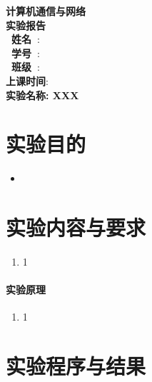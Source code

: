 \documentclass[a4paper]{ctexart}
\begin{document}
  \begin{titlepage}
      \songti
      \begin{center}
        \vspace*{2cm}
        {\fontsize{24pt}{0}
          \textbf{计算机通信与网络\\实验报告\\}
        }
        \vspace*{10cm}
        {\fontsize{16pt}{0}
          \textbf{\ 姓\quad 名\ }: \underline{}\\
          \textbf{\ 学\quad 号\ }: \underline{}\\
          \textbf{\ 班\quad 级\ }: \underline{}\\
          \textbf{上课时间}: \underline{}\\
        }
        \vspace*{7cm}
        {\fontsize{16pt}{0}
          \textbf{实验名称: {\Large XXX}}
        }
      \end{center}
  \end{titlepage}


  \newpage
  \section{实验目的}
    \begin{itemize}
      \item
    \end{itemize}

  \section{实验内容与要求}
    \begin{enumerate}
      \item 1
    \end{enumerate}

    \paragraph{实验原理}
    \begin{enumerate}
      \item 1
    \end{enumerate}

    \newpage
    \section{实验程序与结果}
\end{document}
